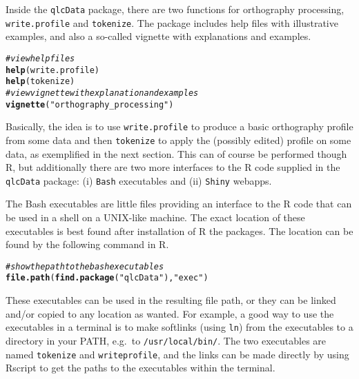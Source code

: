 \documentclass[output=book,nonflat,modfonts,
citecolor=brown,
		]{langsci/langscibook}\usepackage[]{graphicx}\usepackage[]{color}
\makeatletter
\newcommand{\hlstr}[1]{\textcolor[rgb]{0.192,0.494,0.8}{#1}}%
\newcommand{\hlcom}[1]{\textcolor[rgb]{0.678,0.584,0.686}{\textit{#1}}}%
\newcommand{\hlstd}[1]{\textcolor[rgb]{0.345,0.345,0.345}{#1}}%
\newcommand{\hlkwd}[1]{\textcolor[rgb]{0.737,0.353,0.396}{\textbf{#1}}}%
\newenvironment{kframe}{%
 \def\at@end@of@kframe{}%
 \ifinner\ifhmode%
  \def\at@end@of@kframe{\end{minipage}}%
  \begin{minipage}{\columnwidth}%
 \fi\fi%
 \def\FrameCommand##1{\hskip\@totalleftmargin \hskip-\fboxsep
 \colorbox{shadecolor}{##1}\hskip-\fboxsep
     \hskip-\linewidth \hskip-\@totalleftmargin \hskip\columnwidth}%
 \MakeFramed {\advance\hsize-\width
   \@totalleftmargin\z@ \linewidth\hsize
   \@setminipage}}%
 {\par\unskip\endMakeFramed%
 \at@end@of@kframe}
\newenvironment{knitrout}{}{} %
\makeatother
\begin{document}
Inside the \texttt{qlcData} package, there are two functions for
orthography processing, \texttt{write.profile} and \texttt{tokenize}. The package includes
help files with illustrative examples, and also a so-called vignette with
explanations and examples.

\begin{knitrout}\footnotesize
{}\color{fgcolor}\begin{kframe}
\begin{alltt}
\hlcom{# view help files}
\hlkwd{help}\hlstd{(write.profile)}
\hlkwd{help}\hlstd{(tokenize)}
\hlcom{# view vignette with explanation and examples}
\hlkwd{vignette}\hlstd{(}\hlstr{"orthography_processing"}\hlstd{)}
\end{alltt}
\end{kframe}
\end{knitrout}

Basically, the idea is to use \texttt{write.profile} to produce a
basic orthography profile from some data and then \texttt{tokenize} to apply the
(possibly edited) profile on some data, as exemplified in the next section. This
can of course be performed though R, but additionally there are two more
interfaces to the R code supplied in the \texttt{qlcData} package: (i) \texttt{Bash}
executables and (ii) \texttt{Shiny} webapps.

The Bash executables are little files providing an interface to the R code that
can be used in a shell on a UNIX-like machine. The exact location of these
executables is best found after installation of R the packages. The
location can be found by the following command in R. 

\begin{knitrout}\footnotesize
{}\color{fgcolor}\begin{kframe}
\begin{alltt}
\hlcom{# show the path to the bash executables}
\hlkwd{file.path}\hlstd{(}\hlkwd{find.package}\hlstd{(}\hlstr{"qlcData"}\hlstd{),} \hlstr{"exec"}\hlstd{)}
\end{alltt}
\end{kframe}
\end{knitrout}

These executables can be 
used in the resulting file path, or they can be linked and/or copied to any location as wanted. 
For example, a good way to use the executables in a terminal is to
make softlinks (using \texttt{ln}) from the executables to a directory in your
PATH, e.g.\ to \texttt{/usr/local/bin/}. The two executables are named
\texttt{tokenize} and \texttt{writeprofile}, and the links can be made directly 
by using Rscript to get the paths to the executables within the terminal.
\end{document}
